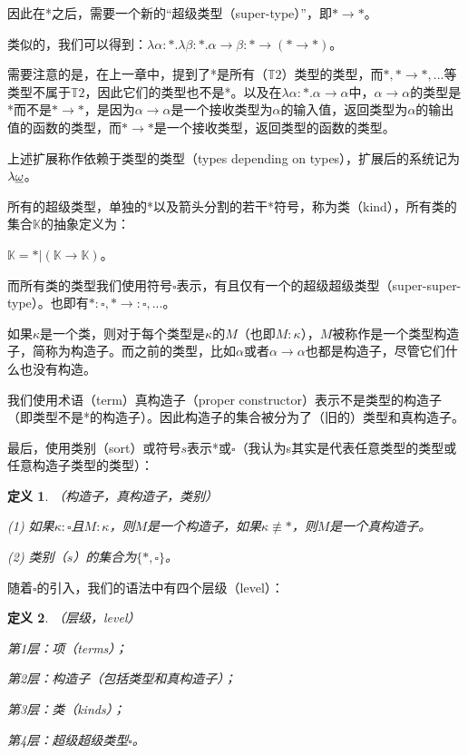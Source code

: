 \documentclass[UTF8]{article}
\newtheorem{thm}{定义}[section]
\begin{document}
		因此在*之后，需要一个新的“超级类型（super-type）”，即$*\rightarrow*$。
		
		类似的，我们可以得到：$\lambda\alpha:*.\lambda\beta:*.\alpha\rightarrow\beta:*\rightarrow(*\rightarrow*)$。
		
		需要注意的是，在上一章中，提到了*是所有（$\mathbb{T}2$）类型的类型，而$*,*\rightarrow*,...$等类型不属于$\mathbb{T}2$，因此它们的类型也不是*。以及在$\lambda\alpha:*.\alpha\rightarrow\alpha$中，$\alpha\rightarrow\alpha$的类型是*而不是$*\rightarrow*$，是因为$\alpha\rightarrow\alpha$是一个接收类型为$\alpha$的输入值，返回类型为$\alpha$的输出值的函数的类型，而$*\rightarrow*$是一个接收类型，返回类型的函数的类型。
		
		上述扩展称作依赖于类型的类型（types depending on types），扩展后的系统记为$\lambda{\uline{\omega}}$。
			
		所有的超级类型，单独的*以及箭头分割的若干*符号，称为类（kind），所有类的集合$\mathbb{K}$的抽象定义为：
		
		$\mathbb{K}=*|(\mathbb{K}\rightarrow\mathbb{K})$。
		
		而所有类的类型我们使用符号$\square$表示，有且仅有一个的超级超级类型（super-super-type）。也即有$*:\square,*\rightarrow:\square,...$。
		
		如果$\kappa$是一个类，则对于每个类型是$\kappa$的$M$（也即$M:\kappa$），$M$被称作是一个类型构造子，简称为构造子。而之前的类型，比如$\alpha$或者$\alpha\rightarrow\alpha$也都是构造子，尽管它们什么也没有构造。
		
		我们使用术语（term）真构造子（proper constructor）表示不是类型的构造子（即类型不是*的构造子）。因此构造子的集合被分为了（旧的）类型和真构造子。
		
		最后，使用类别（sort）或符号$s$表示*或$\square$（我认为s其实是代表任意类型的类型或任意构造子类型的类型）：
		
		\begin{thm}（构造子，真构造子，类别）
			
			(1) 如果$\kappa:\square$且$M:\kappa$，则$M$是一个构造子，如果$\kappa\not\equiv*$，则$M$是一个真构造子。
			
			(2) 类别（$s$）的集合为$\{*,\square\}$。
		\end{thm}
	
		随着$\square$的引入，我们的语法中有四个层级（level）：
		
		\begin{thm}（层级，level）
			
			第1层：项（terms）；
			
			第2层：构造子（包括类型和真构造子）；
			
			第3层：类（kinds）；
			
			第4层：超级超级类型$\square$。
		\end{thm}
	
\end{document}
